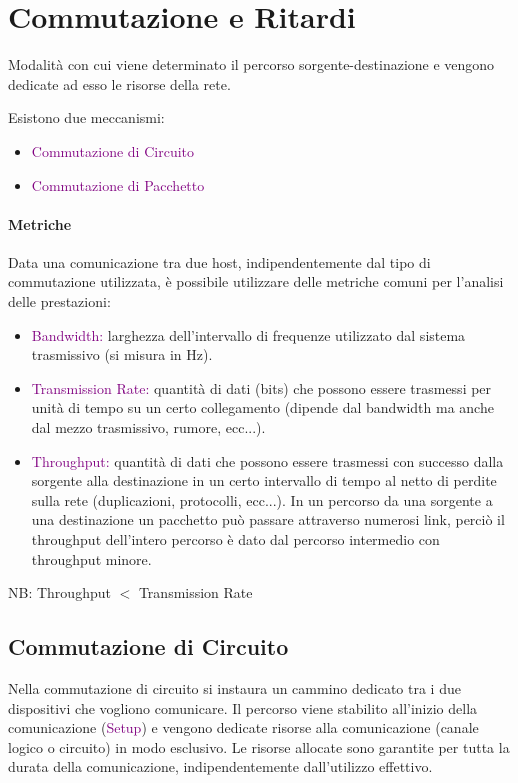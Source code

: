 \section{Commutazione e Ritardi}

    \begin{definition}[Commutazione]
        Modalità con cui viene determinato il percorso sorgente-destinazione e vengono dedicate ad esso le risorse della rete.
    \end{definition}

    Esistono due meccanismi:
    \begin{itemize}
        \item \textcolor{purple}{Commutazione di Circuito}
        \item \textcolor{purple}{Commutazione di Pacchetto}
    \end{itemize}

    \paragraph{Metriche}Data una comunicazione tra due host, indipendentemente dal tipo di commutazione utilizzata, è possibile utilizzare delle metriche comuni per l'analisi delle prestazioni:
    \begin{itemize}
        \item \textcolor{purple}{Bandwidth:} larghezza dell’intervallo di frequenze utilizzato dal sistema trasmissivo (si misura in Hz).
        \item \textcolor{purple}{Transmission Rate:} quantità di dati (bits) che possono essere trasmessi per unità di tempo su un certo collegamento (dipende dal bandwidth ma anche dal mezzo trasmissivo, rumore, ecc...).
        \item \textcolor{purple}{Throughput:} quantità di dati che possono essere trasmessi con successo dalla sorgente alla destinazione in un certo intervallo di tempo al netto di perdite sulla rete (duplicazioni, protocolli, ecc...).
        \newline
        In un percorso da una sorgente a una destinazione un pacchetto può passare attraverso numerosi link, perciò il throughput dell'intero percorso è dato dal percorso intermedio con throughput minore.
    \end{itemize}

    NB: Throughput $<$ Transmission Rate
        
    \subsection{Commutazione di Circuito}   
    Nella commutazione di circuito si instaura un cammino dedicato tra i due dispositivi che vogliono comunicare. Il percorso viene stabilito all’inizio della comunicazione (\textcolor{purple}{Setup}) e vengono dedicate risorse alla comunicazione (canale logico o circuito) in modo esclusivo. Le risorse allocate sono garantite per tutta la durata della comunicazione, indipendentemente dall’utilizzo effettivo.
